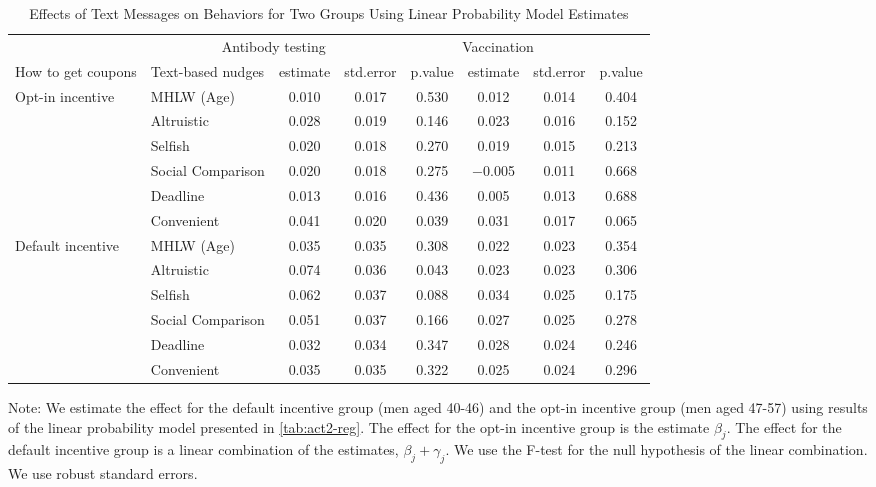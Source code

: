 \begin{table}

\caption{Effects of Text Messages on Behaviors for Two Groups Using Linear Probability Model Estimates \label{tab:act2-reg-ftest}}
\centering
\fontsize{9}{11}\selectfont
\begin{threeparttable}
\begin{tabular}[t]{>{\raggedright\arraybackslash}p{5em}lcccccc}
\toprule
\multicolumn{2}{c}{ } & \multicolumn{3}{c}{Antibody testing} & \multicolumn{3}{c}{Vaccination} \\
\cmidrule(l{3pt}r{3pt}){3-5} \cmidrule(l{3pt}r{3pt}){6-8}
How to get coupons & Text-based nudges & estimate & std.error & p.value & estimate  & std.error  & p.value \\
\midrule
Opt-in incentive & MHLW (Age) & \num{0.010} & \num{0.017} & \num{0.530} & \num{0.012} & \num{0.014} & \num{0.404}\\
 & Altruistic & \num{0.028} & \num{0.019} & \num{0.146} & \num{0.023} & \num{0.016} & \num{0.152}\\
 & Selfish & \num{0.020} & \num{0.018} & \num{0.270} & \num{0.019} & \num{0.015} & \num{0.213}\\
 & Social Comparison & \num{0.020} & \num{0.018} & \num{0.275} & \num{-0.005} & \num{0.011} & \num{0.668}\\
 & Deadline & \num{0.013} & \num{0.016} & \num{0.436} & \num{0.005} & \num{0.013} & \num{0.688}\\
 & Convenient & \num{0.041} & \num{0.020} & \num{0.039} & \num{0.031} & \num{0.017} & \num{0.065}\\
Default incentive & MHLW (Age) & \num{0.035} & \num{0.035} & \num{0.308} & \num{0.022} & \num{0.023} & \num{0.354}\\
 & Altruistic & \num{0.074} & \num{0.036} & \num{0.043} & \num{0.023} & \num{0.023} & \num{0.306}\\
 & Selfish & \num{0.062} & \num{0.037} & \num{0.088} & \num{0.034} & \num{0.025} & \num{0.175}\\
 & Social Comparison & \num{0.051} & \num{0.037} & \num{0.166} & \num{0.027} & \num{0.025} & \num{0.278}\\
 & Deadline & \num{0.032} & \num{0.034} & \num{0.347} & \num{0.028} & \num{0.024} & \num{0.246}\\
 & Convenient & \num{0.035} & \num{0.035} & \num{0.322} & \num{0.025} & \num{0.024} & \num{0.296}\\
\bottomrule
\end{tabular}
\begin{tablenotes}
\item Note: We estimate the effect for the default incentive group (men aged 40-46) and the opt-in incentive group (men aged 47-57) using results of the linear probability model presented in \ref{tab:act2-reg}. The effect for the opt-in incentive group is the estimate $\beta_j$. The effect for the default incentive group is a linear combination of the estimates, $\beta_j + \gamma_j$. We use the F-test for the null hypothesis of the linear combination. We use robust standard errors.
\end{tablenotes}
\end{threeparttable}
\end{table}

